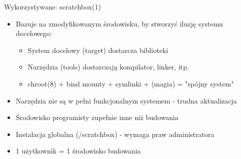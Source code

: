 \documentclass[presentation,aspectratio=43,12pt]{beamer}
\begin{document}
\begin{frame}[label=sec-5-2]{Wykorzystywane: scratchbox(1)}
\begin{itemize}
\item Bazuje na zmodyfikowanym środowisku, by stworzyć iluzję systemu
docelowego:

\begin{itemize}
\item System docelowy (target) dostarcza biblioteki
\item Narzędzia (tools) dostarczają kompilator, linker, itp.
\item chroot(8) + bind mounty + symlinki + (magia) = "spójny system"
\end{itemize}
\end{itemize}

\pause

\begin{itemize}
\item Narzędzia nie są w pełni funkcjonalnym systemem - trudna
aktualizacja

\item Środowisko programisty zupełnie inne niż budowania

\item Instalacja globalna (/scratchbox) - wymaga praw administratora

\item 1 użytkownik = 1 środowisko budowania
\end{itemize}


\end{frame}
\end{document}

